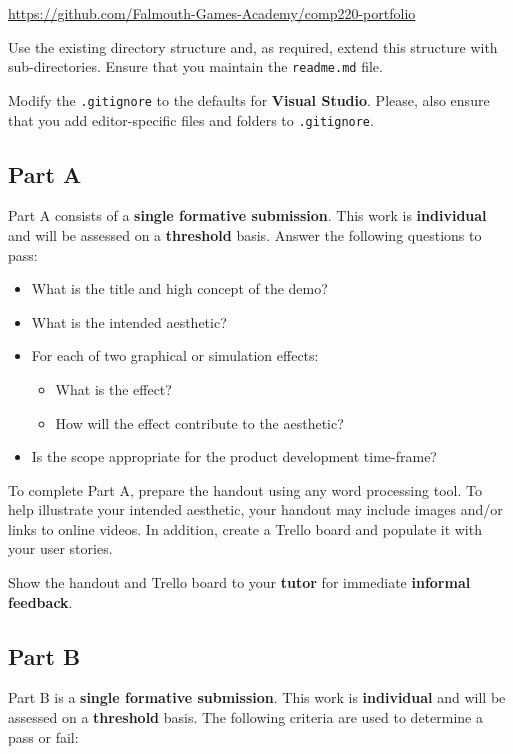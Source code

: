 \documentclass{../fal_assignment}
\begin{document}
\indent \url{https://github.com/Falmouth-Games-Academy/comp220-portfolio}

Use the existing directory structure and, as required, extend this structure with sub-directories.
Ensure that you maintain the \texttt{readme.md} file.

Modify the \texttt{.gitignore} to the defaults for \textbf{Visual Studio}.
Please, also ensure that you add editor-specific files and folders to \texttt{.gitignore}. 

\subsection*{Part A}

Part A consists of a \textbf{single formative submission}. This work is \textbf{individual} and will be assessed on a \textbf{threshold} basis. Answer the following questions to pass:

\begin{itemize}
	\item What is the title and high concept of the demo?
	\item What is the intended aesthetic?
	\item For each of two graphical or simulation effects:
	\begin{itemize}
		\item What is the effect?
		\item How will the effect contribute to the aesthetic?
	\end{itemize}
	\item Is the scope appropriate for the product development time-frame?
\end{itemize}

To complete Part A, prepare the handout using any word processing tool.
To help illustrate your intended aesthetic, your handout may include images and/or links to online videos.
In addition, create a Trello board and populate it with your user stories.

Show the handout and Trello board to your \textbf{tutor} for immediate \textbf{informal feedback}.

\subsection*{Part B}

Part B is a \textbf{single formative submission}. This work is \textbf{individual} and will be assessed on a \textbf{threshold} basis. The following criteria are used to determine a pass or fail:
\end{document}
